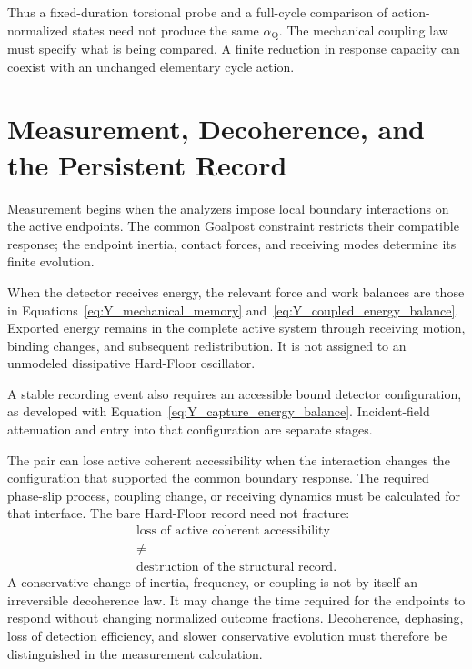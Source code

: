 Thus a fixed-duration torsional probe and a full-cycle comparison of action-normalized states need not produce the same $\alpha_{\mathrm Q}$. The mechanical coupling law must specify what is being compared. A finite reduction in response capacity can coexist with an unchanged elementary cycle action.

\section{Measurement, Decoherence, and the Persistent Record}

Measurement begins when the analyzers impose local boundary interactions on the active endpoints. The common Goalpost constraint restricts their compatible response; the endpoint inertia, contact forces, and receiving modes determine its finite evolution.

When the detector receives energy, the relevant force and work balances are those in Equations~\eqref{eq:Y_mechanical_memory} and~\eqref{eq:Y_coupled_energy_balance}. Exported energy remains in the complete active system through receiving motion, binding changes, and subsequent redistribution. It is not assigned to an unmodeled dissipative Hard-Floor oscillator.

A stable recording event also requires an accessible bound detector configuration, as developed with Equation~\eqref{eq:Y_capture_energy_balance}. Incident-field attenuation and entry into that configuration are separate stages.

The pair can lose active coherent accessibility when the interaction changes the configuration that supported the common boundary response. The required phase-slip process, coupling change, or receiving dynamics must be calculated for that interface. The bare Hard-Floor record need not fracture:
\begin{equation}
    \boxed{
    \begin{gathered}
    \text{loss of active coherent accessibility}\\[-1mm]
    \neq\\[-1mm]
    \text{destruction of the structural record}.
    \end{gathered}
    }
\end{equation}
A conservative change of inertia, frequency, or coupling is not by itself an irreversible decoherence law. It may change the time required for the endpoints to respond without changing normalized outcome fractions. Decoherence, dephasing, loss of detection efficiency, and slower conservative evolution must therefore be distinguished in the measurement calculation.

